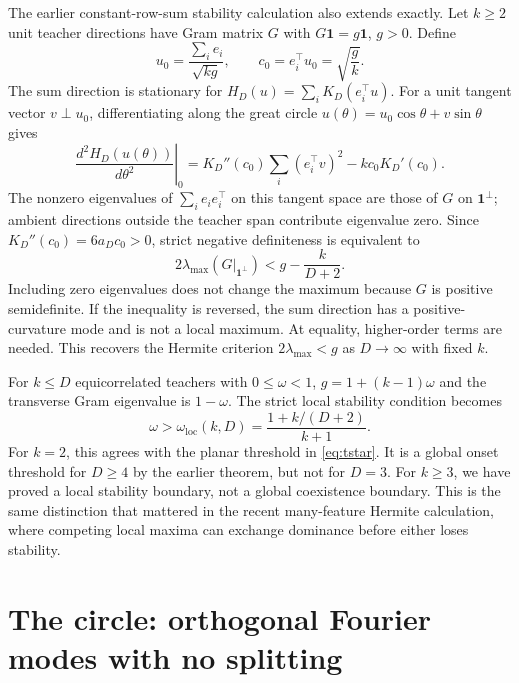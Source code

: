 \documentclass[11pt]{article}
\newcommand{\loc}{\mathrm{loc}}
\theoremstyle{remark}
\begin{document}
The earlier constant-row-sum stability calculation also extends exactly.
Let $k\geq2$ unit teacher directions have Gram matrix $G$ with
$G\mathbf1=g\mathbf1$, $g>0$. Define
\begin{equation}
 u_0=\frac{\sum_i e_i}{\sqrt{kg}},\qquad
 c_0=e_i^\top u_0=\sqrt{\frac gk}.
\end{equation}
The sum direction is stationary for $H_D(u)=\sum_iK_D(e_i^\top u)$.
For a unit tangent vector $v\perp u_0$, differentiating along the great
circle $u(\theta)=u_0\cos\theta+v\sin\theta$ gives
\begin{equation}\label{eq:manyhessian}
 \left.\frac{d^2H_D(u(\theta))}{d\theta^2}\right|_0
 =K_D''(c_0)\sum_i(e_i^\top v)^2-kc_0K_D'(c_0).
\end{equation}
The nonzero eigenvalues of $\sum_i e_ie_i^\top$ on this tangent space
are those of $G$ on $\mathbf1^\perp$; ambient directions outside the
teacher span contribute eigenvalue zero. Since $K_D''(c_0)=6a_Dc_0>0$,
strict negative definiteness is equivalent to
\begin{equation}\label{eq:manystability}
 \boxed{2\lambda_{\max}\!\left(G\big|_{\mathbf1^\perp}\right)
       <g-\frac{k}{D+2}.}
\end{equation}
Including zero eigenvalues does not change the maximum because $G$ is
positive semidefinite. If the inequality is reversed, the sum direction
has a positive-curvature mode and is not a local maximum. At equality,
higher-order terms are needed. This recovers the Hermite criterion
$2\lambda_{\max}<g$ as $D\to\infty$ with fixed $k$.

For $k\leq D$ equicorrelated teachers with $0\leq\omega<1$,
$g=1+(k-1)\omega$ and the transverse Gram eigenvalue is $1-\omega$.
The strict local stability condition becomes
\begin{equation}\label{eq:manylocal}
 \boxed{\omega>\omega_\loc(k,D)
       =\frac{1+k/(D+2)}{k+1}.}
\end{equation}
For $k=2$, this agrees with the planar threshold in
\eqref{eq:tstar}. It is a global onset threshold for $D\geq4$ by the
earlier theorem, but not for $D=3$. For $k\geq3$, we have proved a
local stability boundary, not a global coexistence boundary. This is
the same distinction that mattered in the recent many-feature Hermite
calculation, where competing local maxima can exchange dominance before
either loses stability.

\section{The circle: orthogonal Fourier modes with no splitting}
\end{document}
